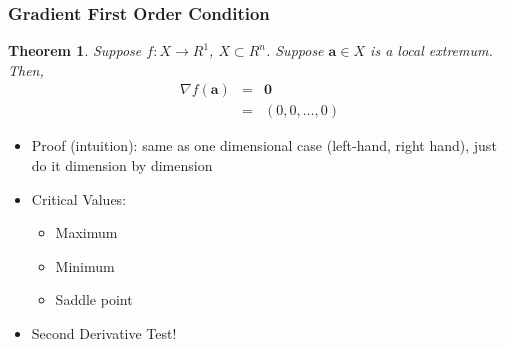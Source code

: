 \documentclass[handout]{beamer}
\newtheorem{thm}{Theorem}
\numberwithin{equation}{section}
\begin{document}
\begin{frame}
\frametitle{Gradient First Order Condition}

\begin{thm}
Suppose $f:X \rightarrow R^{1}$, $X \subset R^{n}$.  Suppose $\boldsymbol{a} \in X$ is a local extremum.  Then, 
\begin{eqnarray}
\nabla f(\boldsymbol{a}) & = & \boldsymbol{0} \nonumber \\
									& = & (0, 0, \hdots, 0) \nonumber 				
\end{eqnarray}

\end{thm} \pause

\begin{itemize}
\item[-] Proof (intuition): same as one dimensional case (left-hand, right hand), just do it dimension by dimension \pause
\item[-] Critical Values: 
\begin{itemize}
\item[1)] Maximum
\item[2)] Minimum 
\item[3)] Saddle point
\end{itemize}
\item[-] Second Derivative Test!
\end{itemize}

\end{frame}
\end{document}
